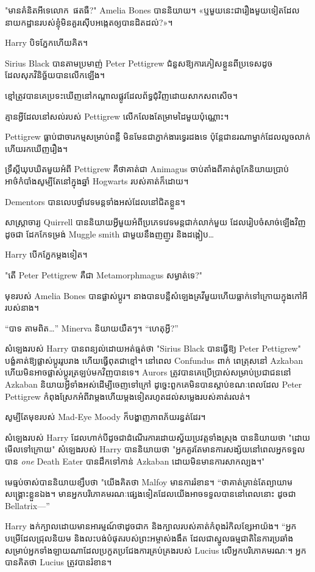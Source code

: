 "មានគំនិតអីទេលោក~ផតធឺ?" Amelia Bones បាននិយាយ។ «ឬ​មួយ​នេះ​ជា​រឿង​មួយ​ទៀត​ដែល​នាយកដ្ឋាន​របស់​ខ្ញុំ​មិន​គួរ​ស៊ើប​អង្កេត​ឲ្យ​បាន​ដិត​ដល់?»។

Harry បិទភ្នែកហើយគិត។

Sirius Black បានតាមប្រមាញ់ Peter Pettigrew ជំនួសឱ្យការភៀសខ្លួនពីប្រទេសដូចដែលសុភវិនិច្ឆ័យបានលើកឡើង។

ខ្មៅ​ត្រូវ​បាន​គេ​ប្រទះ​ឃើញ​នៅ​កណ្តាល​ផ្លូវ​ដែល​ព័ទ្ធ​ជុំវិញ​ដោយ​សាកសព​សើច។

គ្មានអ្វីដែលនៅសល់របស់ Pettigrew លើកលែងតែម្រាមដៃមួយប៉ុណ្ណោះ។

Pettigrew ធ្លាប់ជាចារកម្មសម្រាប់ពន្លឺ មិនមែនជាភ្នាក់ងារទ្វេរដងទេ ប៉ុន្តែជានរណាម្នាក់ដែលលួចលាក់ ហើយរកឃើញរឿង។

ទ្រឹស្តីឃុបឃិតមួយអំពី Pettigrew គឺថាគាត់ជា Animagus ចាប់តាំងពីគាត់ពូកែនិយាយប្រាប់អាថ៌កំបាំងសូម្បីតែនៅក្នុងឆ្នាំ Hogwarts របស់គាត់ក៏ដោយ។

Dementors បានលេបថ្នាំវេទមន្តទាំងអស់ដែលនៅជិតខ្លួន។

សាស្ត្រាចារ្យ Quirrell បាននិយាយអ្វីមួយអំពីប្រភេទវេទមន្តជាក់លាក់មួយ ដែលរៀបចំសាច់ឡើងវិញដូចជា ដែកកែទម្រង់ Muggle smith ជាមួយនឹងញញួរ និងដង្កៀប…

Harry បើកភ្នែកម្តងទៀត។

"តើ Peter Pettigrew គឺជា Metamorphmagus សម្ងាត់ទេ?"

មុខរបស់ Amelia Bones បានផ្លាស់ប្តូរ។ នាង​បាន​បន្លឺ​សំឡេង​គ្រវី​មួយ​ហើយ​ធ្លាក់​ទៅ​ក្រោយ​ក្នុង​កៅអី​របស់​នាង។

“បាទ តាមពិត…” Minerva និយាយយឺតៗ។ “ហេតុអ្វី?”

សំឡេងរបស់ Harry បានពន្យល់ដោយអត់ធ្មត់ថា "Sirius Black បានធ្វើឱ្យ Peter Pettigrew" បង្ខំគាត់ឱ្យផ្លាស់ប្តូររូបរាង ហើយធ្វើពុតជាខ្មៅ។ នៅពេល Confundus ពាក់ ពេត្រុសនៅ Azkaban ហើយមិនអាចផ្លាស់ប្តូរត្រឡប់មកវិញបានទេ។ Aurors ត្រូវបានគេប្រើប្រាស់សម្រាប់ប្រជាជននៅ Azkaban និយាយអ្វីទាំងអស់ដើម្បីចេញទៅក្រៅ ដូច្នេះពួកគេមិនបានស្តាប់ខណៈពេលដែល Peter Pettigrew កំពុងស្រែកអំពីវាម្តងហើយម្តងទៀតរហូតដល់សម្លេងរបស់គាត់រលត់។

សូម្បីតែមុខរបស់ Mad-Eye Moody ក៏បង្ហាញភាពភ័យរន្ធត់ដែរ។

សំឡេងរបស់ Harry ដែលហាក់បីដូចជាដំណើរការដោយស្វ័យប្រវត្តទាំងស្រុង បាននិយាយថា "ដោយមើលទៅក្រោយ" សំឡេងរបស់ Harry បាននិយាយថា "អ្នកគួរតែមានការសង្ស័យនៅពេលអ្នកទទួលបាន \emph{one} Death Eater បានដឹកទៅកាន់ Azkaban ដោយមិនមានការសាកល្បង។"

មេធ្មប់ចាស់បាននិយាយខ្សឹបថា "យើងគិតថា Malfoy មានការរំខាន។ “ថា​គាត់​គ្រាន់​តែ​ព្យាយាម​សង្គ្រោះ​ខ្លួន​ឯង។ មានអ្នកបរិភោគមរណៈផ្សេងទៀតដែលយើងអាចទទួលបាននៅពេលនោះ ដូចជា Bellatrix—”

Harry ងក់ក្បាលដោយមានអារម្មណ៍ថាដូចជាក និងក្បាលរបស់គាត់កំពុងរំកិលខ្សែអាយ៉ង។ “អ្នកបម្រើដែលជ្រុលនិយម និងលះបង់បំផុតរបស់ព្រះអម្ចាស់ងងឹត ដែលជាស្នូលធម្មជាតិនៃការប្រឆាំងសម្រាប់អ្នកទាំងឡាយណាដែលប្រកួតប្រជែងការគ្រប់គ្រងរបស់ Lucius លើអ្នកបរិភោគមរណៈ។ អ្នក​បាន​គិត​ថា Lucius ត្រូវ​បាន​រំខាន។

